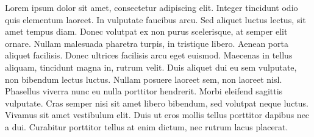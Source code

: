 Lorem ipsum dolor sit amet, consectetur adipiscing elit. Integer tincidunt odio quis elementum laoreet. In vulputate faucibus arcu. Sed aliquet luctus lectus, sit amet tempus diam. Donec volutpat ex non purus scelerisque, at semper elit ornare. Nullam malesuada pharetra turpis, in tristique libero. Aenean porta aliquet facilisis. Donec ultrices facilisis arcu eget euismod. Maecenas in tellus aliquam, tincidunt magna in, rutrum velit. Duis aliquet dui eu sem vulputate, non bibendum lectus luctus. Nullam posuere laoreet sem, non laoreet nisl. Phasellus viverra nunc eu nulla porttitor hendrerit. Morbi eleifend sagittis vulputate. Cras semper nisi sit amet libero bibendum, sed volutpat neque luctus. Vivamus sit amet vestibulum elit. Duis ut eros mollis tellus porttitor dapibus nec a dui. Curabitur porttitor tellus at enim dictum, nec rutrum lacus placerat. 
